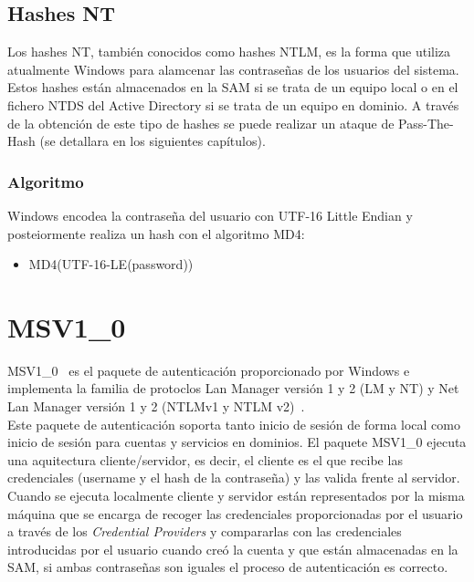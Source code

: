 \subsection{Hashes NT}

Los hashes NT, también conocidos como hashes NTLM, es la forma que utiliza atualmente Windows para alamcenar las contraseñas de los usuarios del sistema. Estos hashes están almacenados en la SAM si se trata de un equipo local o en el fichero NTDS del Active Directory si se trata de un equipo en dominio. A través de la obtención de este tipo de hashes se puede realizar un ataque de Pass-The-Hash (se detallara en los siguientes capítulos).

\subsubsection{Algoritmo}

Windows encodea la contraseña del usuario con UTF-16 Little Endian y posteiormente realiza un hash con el algoritmo MD4: 

\begin{itemize}
\item MD4(UTF-16-LE(password))
\end{itemize}

\section{MSV1\_0}

MSV1\_0~\cite{Capitulo3:MSV10} es el paquete de autenticación proporcionado por Windows e implementa la familia de protoclos Lan Manager versión 1 y 2 (LM y NT) y Net Lan Manager versión 1 y 2 (NTLMv1 y NTLM v2)~\cite{Capitulo3:NTLM}. \\

Este paquete de autenticación soporta tanto inicio de sesión de forma local como inicio de sesión para cuentas y servicios en dominios. El paquete MSV1\_0 ejecuta una aquitectura cliente/servidor, es decir, el cliente es el que recibe las credenciales (username y el hash de la contraseña) y las valida frente al servidor. \\

Cuando se ejecuta localmente cliente y servidor están representados por la misma máquina que se encarga de recoger las credenciales proporcionadas por el usuario a través de los {\it Credential Providers} y compararlas con las credenciales introducidas por el usuario cuando creó la cuenta y que están almacenadas en la SAM, si ambas contraseñas son iguales el proceso de autenticación es correcto. \\

